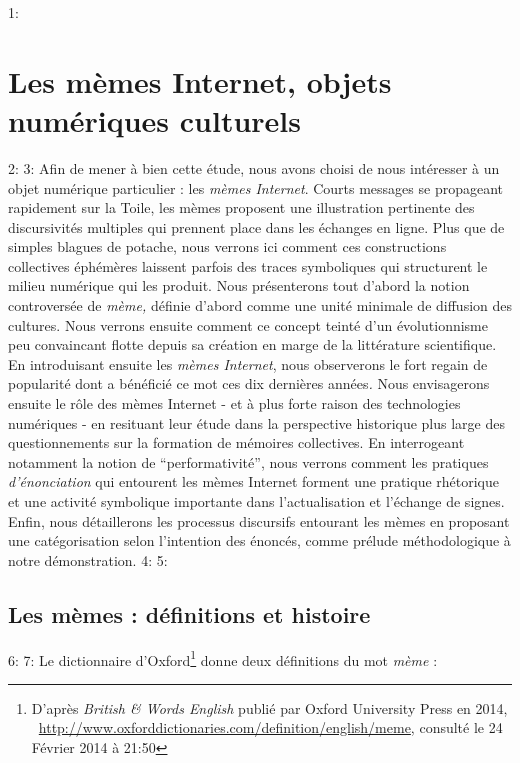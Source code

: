 1: \chapter[Les m\`emes Internet, objets num\'eriques culturels]{Les m\`emes Internet, objets num\'eriques culturels}
2: 
3: Afin de mener \`a bien cette \'etude, nous avons choisi de nous int\'eresser \`a un objet num\'erique particulier : les \textit{m\`emes Internet}. Courts messages se propageant rapidement sur la Toile, les m\`emes proposent une illustration pertinente des discursivit\'es multiples qui prennent place dans les \'echanges en ligne. Plus que de simples blagues de potache, nous verrons ici comment ces constructions collectives \'eph\'em\`eres laissent parfois des traces symboliques qui structurent le milieu num\'erique qui les produit. Nous pr\'esenterons tout d{\textquoteright}abord la notion controvers\'ee de \textit{m\`eme, }d\'efinie d{\textquoteright}abord comme une unit\'e minimale de diffusion des cultures. Nous verrons ensuite comment ce concept teint\'e d{\textquoteright}un \'evolutionnisme peu convaincant flotte depuis sa cr\'eation en marge de la litt\'erature scientifique. En introduisant ensuite les \textit{m\`emes Internet}, nous observerons le fort regain de popularit\'e dont a b\'en\'efici\'e ce mot ces dix derni\`eres ann\'ees\textit{. }Nous envisagerons ensuite le r\^ole des m\`emes Internet - et \`a plus forte raison des technologies num\'eriques - en resituant leur \'etude dans la perspective historique plus large des questionnements sur la formation de m\'emoires collectives. En interrogeant notamment la notion de {\textquotedblleft}performativit\'e{\textquotedblright}, nous verrons comment les pratiques \textit{d{\textquoteright}\'enonciation }qui entourent les m\`emes Internet forment une pratique rh\'etorique et une activit\'e symbolique importante dans l{\textquoteright}actualisation et l{\textquoteright}\'echange de signes. Enfin, nous d\'etaillerons les processus discursifs entourant les m\`emes en proposant une cat\'egorisation selon l{\textquoteright}intention des \'enonc\'es, comme pr\'elude m\'ethodologique \`a notre d\'emonstration.
4: 
5: \section[Les m\`emes : d\'efinitions et histoire ]{Les m\`emes : d\'efinitions et histoire } 
6: 
7: Le dictionnaire d{\textquoteright}Oxford\footnote{ D{\textquoteright}apr\`es \textit{British \& Words English} publi\'e par Oxford University Press en 2014, \ \url{http://www.oxforddictionaries.com/definition/english/meme}, consult\'e le 24 F\'evrier 2014 \`a 21:50} donne deux d\'efinitions du mot \textit{m\`eme }: 
